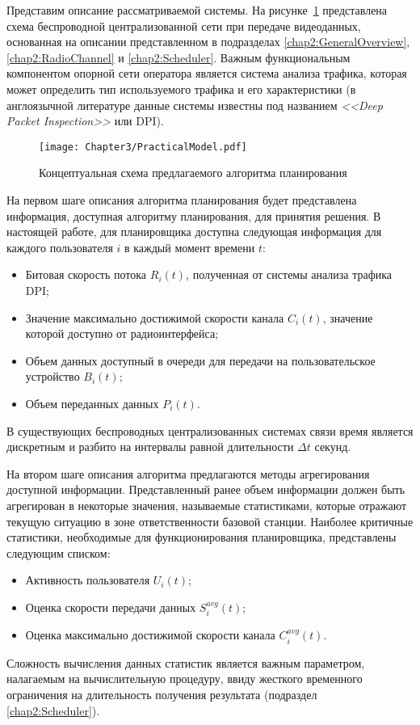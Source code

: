 Представим описание рассматриваемой системы. На рисунке~\ref{fig:PracticalModel} представлена схема беспроводной централизованной сети при передаче видеоданных, основанная на описании представленном в подразделах \ref{chap2:GeneralOverview}, \ref{chap2:RadioChannel} и \ref{chap2:Scheduler}. Важным функциональным компонентом опорной сети оператора является система анализа трафика, которая может определить тип используемого трафика и его характеристики (в англоязычной литературе данные системы известны под названием \textit{<<Deep Packet Inspection>>} или DPI).%

\begin{figure}[htbp]
\begin{center}
\texttt{[image: Chapter3/PracticalModel.pdf]}
\caption{Концептуальная схема предлагаемого алгоритма планирования}
\label{fig:PracticalModel}
\end{center}
\end{figure}

На первом шаге описания алгоритма планирования будет представлена информация, доступная алгоритму планирования, для принятия решения. В настоящей работе, для планировщика доступна следующая информация для каждого пользователя $i$ в каждый момент времени $t$:
\begin{itemize}
	\item Битовая скорость потока $R_i(t)$, полученная от системы анализа трафика DPI;
	\item Значение максимально достижимой скорости канала $C_i(t)$, значение которой доступно от радиоинтерфейса;
	\item Объем данных доступный в очереди для передачи на пользовательское устройство $B_i(t)$;
	\item Объем переданных данных $P_i(t)$.
\end{itemize}
В существующих беспроводных централизованных системах связи время является дискретным и разбито на интервалы равной длительности $\Delta t$ секунд.

На втором шаге описания алгоритма предлагаются методы агрегирования доступной информации. Представленный ранее объем информации должен быть агрегирован в некоторые значения, называемые статистиками, которые отражают текущую ситуацию в зоне ответственности базовой станции. Наиболее критичные статистики, необходимые для функционирования планировщика, представлены следующим списком:
\begin{itemize}
	\item Активность пользователя $U_i(t)$;
	\item Оценка скорости передачи данных $S_i^{avg}(t)$;
	\item Оценка максимально достижимой скорости канала $C_i^{avg}(t)$.
\end{itemize}
Сложность вычисления данных статистик является важным параметром, налагаемым на вычислительную процедуру, ввиду жесткого временного ограничения на длительность получения результата (подраздел \ref{chap2:Scheduler}).

